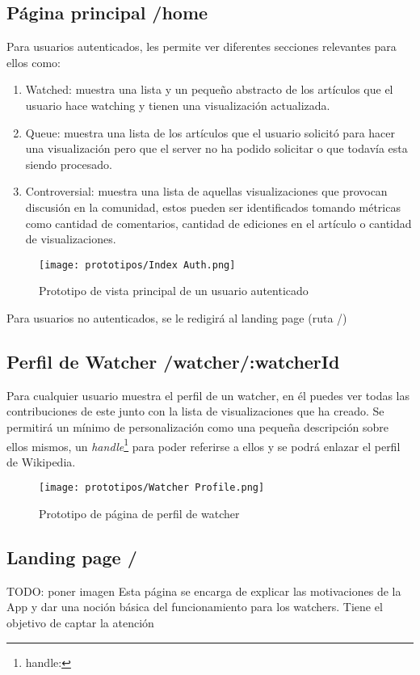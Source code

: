 \subsection{Página principal /home}
Para usuarios autenticados, les permite ver diferentes secciones relevantes para ellos como: 
\begin{enumerate}
    \item Watched: muestra una lista y un pequeño abstracto de los artículos que el usuario hace watching y tienen una visualización actualizada.
    \item Queue: muestra una lista de los artículos que el usuario solicitó para hacer una visualización pero que el server no ha podido solicitar o que todavía esta siendo procesado.
    \item Controversial: muestra una lista de aquellas visualizaciones que provocan discusión en la comunidad, estos pueden ser identificados tomando métricas como cantidad de comentarios, cantidad de ediciones en el artículo o cantidad de visualizaciones.
\end{enumerate}

\begin{figure}[H]
    \centering
    \texttt{[image: prototipos/Index Auth.png]}
    \caption{Prototipo de vista principal de un usuario autenticado}
    \label{PrototipoHomePage}
\end{figure}

Para usuarios no autenticados, se le redigirá al landing page (ruta /)

\subsection{Perfil de Watcher /watcher/:watcherId}
Para cualquier usuario muestra el perfil de un watcher, en él puedes ver todas las contribuciones de este junto con la lista de visualizaciones que ha creado.
Se permitirá un mínimo de personalización como una pequeña descripción sobre ellos mismos, un \textit{handle}\footnote{handle: } para poder referirse a ellos y se podrá enlazar el perfil de Wikipedia.

\begin{figure}[H]
    \centering
    \texttt{[image: prototipos/Watcher Profile.png]}
    \caption{Prototipo de página de perfil de watcher}
    \label{PrototipoWatchersProfile}
\end{figure}

\subsection{Landing page /}
TODO: poner imagen
Esta página se encarga de explicar las motivaciones de la App y dar una noción básica del funcionamiento para los watchers.
Tiene el objetivo de captar la atención 


